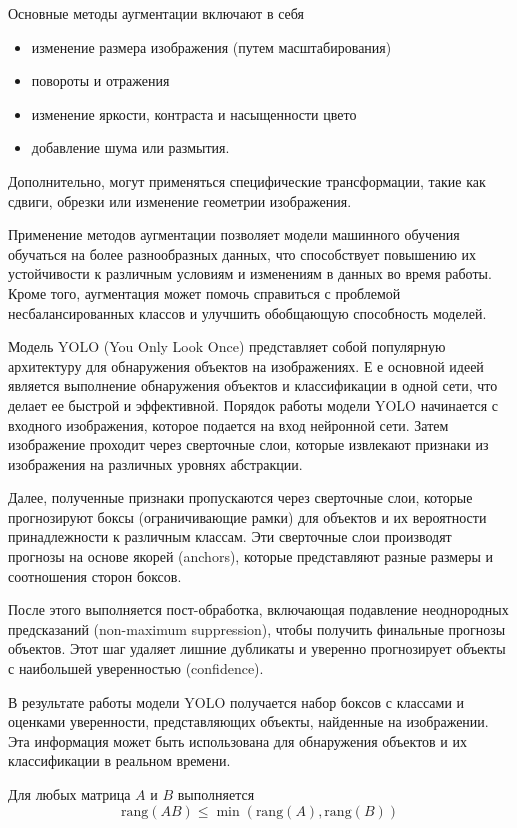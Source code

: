 Основные методы аугментации включают в себя
\begin{itemize}
    \item изменение размера изображения (путем масштабирования)
    \item  повороты и отражения 
    \item  изменение яркости, контраста и насыщенности цвето
    \item добавление шума или размытия.
\end{itemize}    
    
Дополнительно, могут применяться специфические трансформации, такие как сдвиги, обрезки или изменение геометрии изображения.

Применение методов аугментации позволяет модели машинного обучения обучаться на более разнообразных данных, 
что способствует повышению их устойчивости к различным условиям и изменениям в данных во время работы.
Кроме того, аугментация может помочь справиться с проблемой несбалансированных классов и улучшить обобщающую способность моделей.

Модель YOLO (You Only Look Once) представляет собой популярную архитектуру для обнаружения объектов на изображениях. Е
е основной идеей является выполнение обнаружения объектов и классификации в одной сети, что делает ее быстрой и эффективной.
\cite{kirillov2023segment}
Порядок работы модели YOLO начинается с входного изображения, которое подается на вход нейронной сети. Затем изображение проходит через сверточные слои, которые извлекают признаки из изображения на различных уровнях абстракции.

Далее, полученные признаки пропускаются через сверточные слои, которые прогнозируют боксы (ограничивающие рамки) для объектов и их вероятности принадлежности к различным классам. Эти сверточные слои производят прогнозы на основе якорей (anchors), которые представляют разные размеры и соотношения сторон боксов.

После этого выполняется пост-обработка, включающая подавление неоднородных предсказаний (non-maximum suppression), чтобы получить финальные прогнозы объектов. Этот шаг удаляет лишние дубликаты и уверенно прогнозирует объекты с наибольшей уверенностью (confidence).

В результате работы модели YOLO получается набор боксов с классами и оценками уверенности, представляющих объекты, найденные на изображении. 
Эта информация может быть использована для обнаружения объектов и их классификации в реальном времени.


Для любых матрица $A$ и $B$ выполняется
\begin{equation}
    \text{rang}(AB) \le \min\left(\text{rang}(A),\text{rang}(B)\right)
\end{equation}
   
